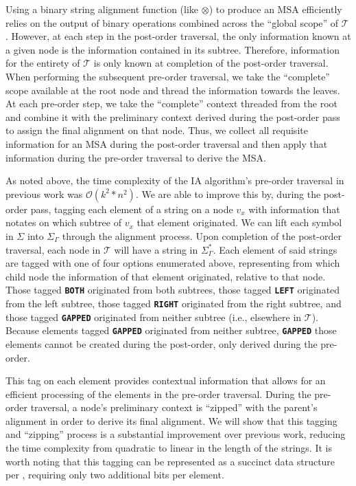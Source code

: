 \documentclass{bmcart}
\begin{document}
Using a binary string alignment function (like $\otimes$) to produce an MSA efficiently relies on the output of binary operations combined across the ``global scope'' of $\mathcal{T}$.
However, at each step in the post-order traversal, the only information known at a given node is the information contained in its subtree.
Therefore, information for the entirety of $\mathcal{T}$ is only known at completion of the post-order traversal.
When performing the subsequent pre-order traversal, we take the ``complete'' scope available at the root node and thread the information towards the leaves.
At each pre-order step, we take the ``complete'' context threaded from the root and combine it with the preliminary context derived during the post-order pass to assign the final alignment on that node.
Thus, we collect all requisite information for an MSA during the post-order traversal and then apply that information during the pre-order traversal to derive the MSA.

As noted above, the time complexity of the IA algorithm's pre-order traversal in previous work was $\mathcal{O}(k^2 * n^2)$.
We are able to improve this by, during the post-order pass, tagging each element of a string on a node $v_x$ with information that notates on which subtree of $v_x$ that element originated.
We can lift each symbol in $\Sigma$ into $\Sigma_{\Gamma}$ through the alignment process.
Upon completion of the post-order traversal, each node in $\mathcal{T}$ will have a string in $\Sigma_{\Gamma}^{*}$.
Each element of said strings are tagged with one of four options enumerated above, representing from which child node the information of that element originated, relative to that node.
Those tagged \textbf{\texttt{BOTH}} originated from both subtrees, those tagged \textbf{\texttt{LEFT}} originated from the left subtree, those tagged \textbf{\texttt{RIGHT}} originated from the right subtree, and those tagged \textbf{\texttt{GAPPED}} originated from neither subtree (i.e., elsewhere in $\mathcal{T}$).
Because elements tagged \textbf{\texttt{GAPPED}} originated from neither subtree, \textbf{\texttt{GAPPED}} those elements cannot be created during the post-order, only derived during the pre-order.

This tag on each element provides contextual information that allows for an efficient processing of the elements in the pre-order traversal.
During the pre-order traversal, a node's preliminary context is ``zipped'' with the parent's alignment in order to derive its final alignment.
We will show that this tagging and ``zipping'' process is a substantial improvement over previous work, reducing the time complexity from quadratic to linear in the length of the strings.
It is worth noting that this tagging can be represented as a succinct data structure per \cite{Jacobson1988}, requiring only two additional bits per element.
\end{document}
